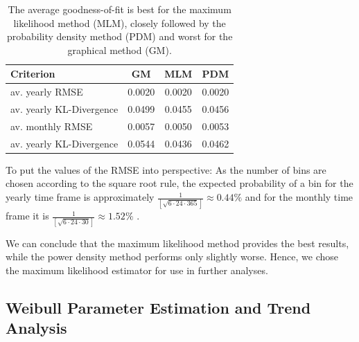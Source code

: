 \documentclass{article}
\theoremstyle{plain}
\theoremstyle{definition}
\theoremstyle{remark}
\begin{document}
\begin{table}
    \begin{center}
        \begin{tabular}{l || c|c|c}
           Criterion & GM & MLM & PDM \\
            \hline
             av. yearly RMSE & 0.0020 & 0.0020 & 0.0020 \\
             av. yearly KL-Divergence & 0.0499 & 0.0455 & 0.0456 \\
             av. monthly RMSE & 0.0057 & 0.0050 & 0.0053 \\
             av. yearly KL-Divergence & 0.0544 & 0.0436  & 0.0462
        \end{tabular}
    \end{center}
    \caption{The average goodness-of-fit is best for the maximum likelihood method (MLM), closely followed by the probability density method (PDM) and 
    worst for the graphical method (GM). }\label{tab:metrics}
\end{table}

To put the values of the RMSE into perspective: As the number of bins are chosen according to the square root rule, the expected probability 
of a bin for the yearly time frame is approximately $\frac{1}{[\sqrt{6 \cdot 24 \cdot 365 }]} \approx 0.44 \%$ and for the monthly time frame it is 
 $\frac{1}{[\sqrt{6 \cdot 24 \cdot 30 }]} \approx 1.52 \%$ .

We can conclude that the maximum likelihood method provides the best results, 
while the power density method performs only slightly worse. 
Hence, we chose the maximum likelihood estimator for use in further analyses. 

\fi


\subsection{Weibull Parameter Estimation and Trend Analysis}
\label{sec:trend}
\end{document}
